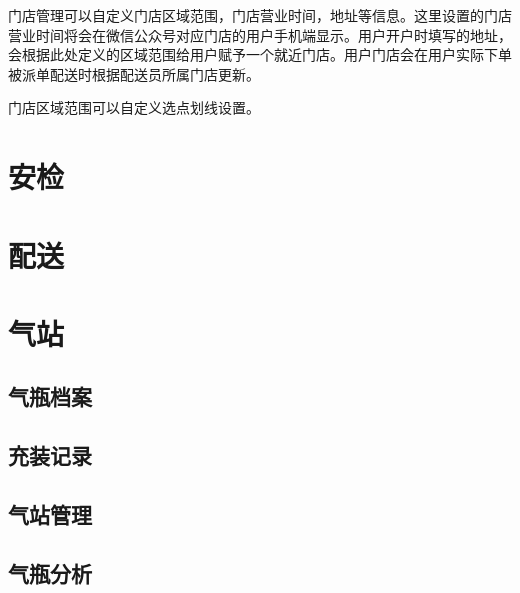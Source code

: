 \documentclass[UTF8]{ctexart}
\begin{document}
门店管理可以自定义门店区域范围，门店营业时间，地址等信息。这里设置的门店营业时间将会在微信公众号对应门店的用户手机端显示。用户开户时填写的地址，会根据此处定义的区域范围给用户赋予一个就近门店。用户门店会在用户实际下单被派单配送时根据配送员所属门店更新。


门店区域范围可以自定义选点划线设置。



\section{安检}


\section{配送}


\section{气站}

\subsection{气瓶档案}

\subsection{充装记录}

\subsection{气站管理}

\subsection{气瓶分析}
\end{document}

